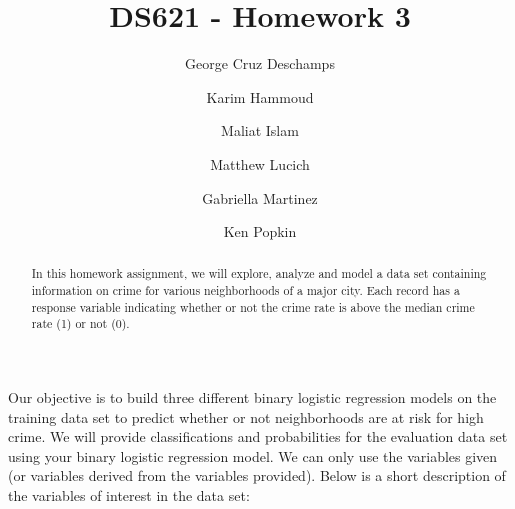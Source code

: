\documentclass[3p]{elsarticle} %
\begin{document}
\begin{frontmatter}

  \title{DS621 - Homework 3}
    \author[Critical Thinking Group 2 - DS621]{George Cruz Deschamps}
    \author[Critical Thinking Group 2 - DS621]{Karim Hammoud}
    \author[Critical Thinking Group 2 - DS621]{Maliat Islam}
    \author[Critical Thinking Group 2 - DS621]{Matthew Lucich}
    \author[Critical Thinking Group 2 - DS621]{Gabriella Martinez}
    \author[Critical Thinking Group 2 - DS621]{Ken Popkin}
      
  \begin{abstract}
  In this homework assignment, we will explore, analyze and model a data
  set containing information on crime for various neighborhoods of a major
  city. Each record has a response variable indicating whether or not the
  crime rate is above the median crime rate (1) or not (0).
  \end{abstract}
  
 \end{frontmatter}

Our objective is to build three different binary logistic regression
models on the training data set to predict whether or not neighborhoods
are at risk for high crime. We will provide classifications and
probabilities for the evaluation data set using your binary logistic
regression model. We can only use the variables given (or variables
derived from the variables provided). Below is a short description of
the variables of interest in the data set:
\end{document}
